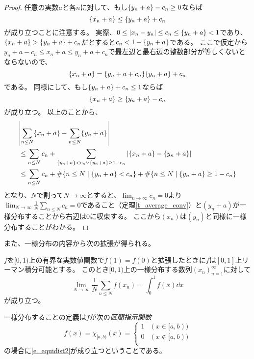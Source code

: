 \begin{proof}
任意の実数$a$と各$n$に対して、もし$\{y_n+a\}-c_n \ge 0$ならば
$$
\{x_n+a\} \le \{y_n+a\}+c_n
$$
が成り立つことに注意する。
実際、$0 \le |x_n-y_n| \le c_n \le \{y_n+a\} < 1$であり、$\{x_n+a\} > \{y_n+a\}+c_n$だとすると$c_n < 1-\{y_n+a\}$である。
ここで仮定から$y_n+a-c_n \le x_n+a \le y_n+a+c_n$で最左辺と最右辺の整数部分が等しくないとならないので、
$$
\{x_n+a\} = \{y_n+a+c_n\} \{y_n+a\}+c_n
$$
である。
同様にして、もし$\{y_n+a\}+c_n \le 1$ならば
$$
\{x_n+a\} \ge \{y_n+a\}-c_n
$$
が成り立つ。
以上のことから、
$$
\begin{aligned}
&\abs{\sum_{n \le N}\{x_n+a\}-\sum_{n \le N}\{y_n+a\}} \\
&\le \sum_{n \le N}c_n+\sum_{\{y_n+a\} < c_n \lor \{y_n+a\} \ge 1-c_n}|\{x_n+a\}-\{y_n+a\}| \\
&\le \sum_{n \le N}c_n+\#\{ n \le N \mid \{y_n+a\} < c_n \}+\#\{ n \le N \mid \{y_n+a\} \ge 1-c_n \}
\end{aligned}
$$
となり、$N$で割って$N \to \infty$とすると、$\lim_{n \to \infty}c_n = 0$より$\lim_{N \to \infty}\frac{1}{N}\sum_{n \le N}c_n = 0$であること（定理\ref{t_average_conv}）と$(y_n+a)$が一様分布することから右辺は$0$に収束する。
ここから$(x_n)$は$(y_n)$と同様に一様分布することがわかる。
\end{proof}

また、一様分布の内容から次の拡張が得られる。

\begin{proposition}
$f$を$[0, 1)$上の有界な実数値関数で$f(1) = f(0)$と拡張したときに$f$は$[0, 1]$上リーマン積分可能とする。
このとき$[0, 1)$上の一様分布する数列$(x_n)_{n = 1}^\infty$に対して
\begin{equation}
\label{e_equidist2}
\lim_{N \to \infty}\frac{1}{N}\sum_{n \le N}f(x_n) = \int_0^1 f(x)\dd{x}
\end{equation}
が成り立つ。
\end{proposition}

\begin{remark}
一様分布することの定義は$f$が次の\emph{区間指示関数}
$$
f(x) = \chi_{[a, b)}(x) =
\begin{cases}
1 & (x \in [a, b)) \\
0 & (x \notin [a, b)) \\
\end{cases}
$$
の場合に\eqref{e_equidist2}が成り立つということである。
\end{remark}

